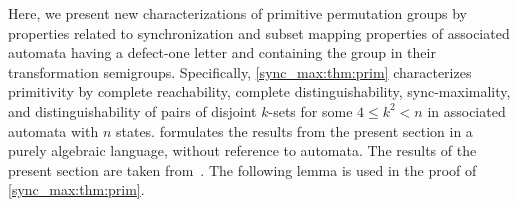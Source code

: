 
Here, we present new characterizations
of primitive permutation groups by properties
related to synchronization and subset mapping properties of associated
automata having a defect-one letter and containing the group in their
transformation semigroups.
Specifically, \cref{sync_max:thm:prim}
characterizes primitivity
by complete reachability, complete distinguishability,
sync-maximality, and distinguishability of pairs of disjoint $k$-sets for some $4 \le k^2 < n$ in associated automata with $n$ states.
formulates the results from the present section
in a purely algebraic language, without
reference to automata. The results of the present section
are taken from~\cite{HoffmannLATAextended2}. 
The following lemma is used in the proof of \cref{sync_max:thm:prim}.
 
